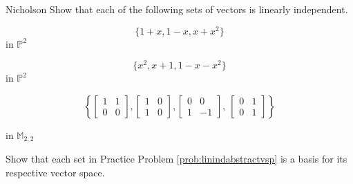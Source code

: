 \documentclass{ximera}
\begin{document}
\begin{problem}\label{prob:linindabstractvsp}
{\color{red}Nicholson} Show that each of the following sets of vectors is linearly independent.

\begin{problem}\label{prob:linindabstractvsp1}
$$\{1 + x, 1 - x, x + x^{2}\}$$ in $\mathbb{P}^{2}$
\end{problem}

\begin{problem}\label{prob:linindabstractvsp2}
$$\{x^{2}, x + 1, 1 - x - x^{2}\}$$ in $\mathbb{P}^{2}$
\end{problem}

\begin{problem}\label{prob:linindabstractvsp3}
$$
\left\{
\begin{bmatrix}
1 & 1 \\
0 & 0
\end{bmatrix}
, 
\begin{bmatrix}
1 & 0 \\
1 & 0
\end{bmatrix}
, 
\begin{bmatrix}
0 & 0 \\
1 & -1
\end{bmatrix}
,\
\begin{bmatrix}
0 & 1 \\
0 & 1
\end{bmatrix}
\right\}$$ 

in $\mathbb{M}_{2,2}$
\end{problem}

\end{problem}

\begin{problem}
Show that each set in Practice Problem \ref{prob:linindabstractvsp} is a basis for its respective vector space.
\end{problem}
\end{document}
